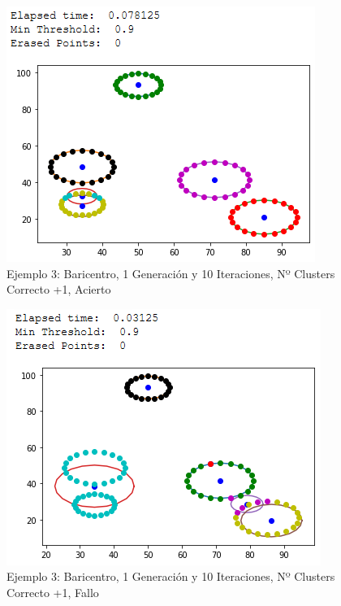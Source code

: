 \documentclass[conference,a4paper]{IEEEtran}
\begin{document}
\begin{figure}[H]
\centering
\includegraphics[scale=0.65]{Experimentacion/Ejemplo3/ej3_b_1_10_mc_correct2}
\caption{Ejemplo 3: Baricentro, 1 Generación y 10 Iteraciones,  Nº Clusters Correcto +1, Acierto\\}
\end{figure}

\begin{figure}[H]
\centering
\includegraphics[scale=0.65]{Experimentacion/Ejemplo3/ej3_b_1_10_mc_wrong}
\caption{Ejemplo 3: Baricentro, 1 Generación y 10 Iteraciones,  Nº Clusters Correcto +1, Fallo\\}
\end{figure}
\end{document}
